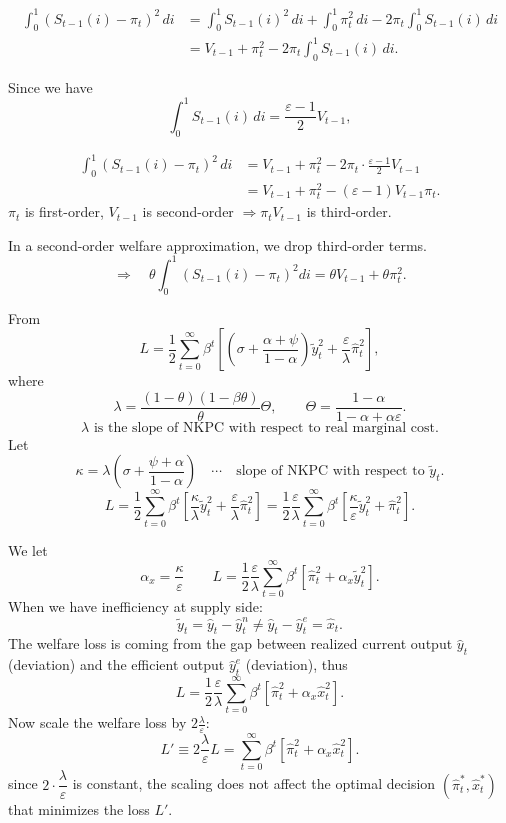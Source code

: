 \documentclass[11pt,fleqn]{article}
\newcommand{\purple}[1]{\textcolor{notePurple}{#1}}
\newcommand{\green}[1]{\textcolor{noteGreen}{#1}}
\newcommand{\purp}[1]{\purple{#1}}
\begin{document}
\begin{align*}
\int_0^1\left(S_{t-1}\left(i\right)-\pi_t\right)^2\,di
&=
\int_0^1 S_{t-1}\left(i\right)^2\,di
+\int_0^1 \pi_t^2\,di
-2\pi_t\int_0^1 S_{t-1}\left(i\right)\,di \\[2pt]
&=
V_{t-1}
+\pi_t^2
-2\pi_t\int_0^1 S_{t-1}\left(i\right)\,di .
\end{align*}

Since we have
\[
\int_0^1 S_{t-1}\left(i\right)\,di
=
\frac{\varepsilon-1}{2}V_{t-1},
\]

\begin{align*}
\int_0^1\left(S_{t-1}\left(i\right)-\pi_t\right)^2\,di
&=
V_{t-1}
+\pi_t^2
-2\pi_t\cdot
\frac{\varepsilon-1}{2}V_{t-1} \\[2pt]
&=
V_{t-1}
+\pi_t^2
-\left(\varepsilon-1\right)V_{t-1}\pi_t .
\end{align*}
\green{$\pi_t$ is first-order, $V_{t-1}$ is second-order $\Rightarrow \pi_tV_{t-1}$ is third-order.}

\green{In a second-order welfare approximation, we drop third-order terms.}
\[
\Rightarrow\quad
\theta\int_0^1\left(S_{t-1}\left(i\right)-\pi_t\right)^2di=\theta V_{t-1}+\theta\pi_t^2.
\]

From
\[
L=\frac12\sum_{t=0}^{\infty}\beta^t
\left[\left(\sigma+\frac{\alpha+\psi}{1-\alpha}\right)\tilde y_t^2
+\frac{\varepsilon}{\lambda}\hat\pi_t^2\right],
\]
where
\[
\lambda=\frac{\left(1-\theta\right)\left(1-\beta\theta\right)}{\theta}\Theta ,
\qquad
\Theta=\frac{1-\alpha}{1-\alpha+\alpha\varepsilon}.
\]
\[
\lambda\text{ is the slope of NKPC with respect to real marginal cost.}
\]
Let
\[
\kappa=\lambda\left(\sigma+\frac{\psi+\alpha}{1-\alpha}\right)
\quad\cdots\quad
\text{slope of NKPC with respect to }\tilde y_t.
\]
\[
L
=
\frac12\sum_{t=0}^{\infty}\beta^t
\left[
\frac{\kappa}{\lambda}\tilde y_t^2
+
\frac{\varepsilon}{\lambda}\hat\pi_t^2
\right]
=
\frac12\frac{\varepsilon}{\lambda}
\sum_{t=0}^{\infty}\beta^t
\left[
\frac{\kappa}{\varepsilon}\tilde y_t^2
+
\hat\pi_t^2
\right].
\]

\par\vspace{0.6em}
We let
\[
\alpha_x=\frac{\kappa}{\varepsilon}\qquad
L=\frac12\frac{\varepsilon}{\lambda}\sum_{t=0}^{\infty}\beta^t
\left[\hat\pi_t^2+\alpha_x\tilde y_t^2\right].
\]
When we have inefficiency at supply side:
\[
\tilde{y}_t
=
\hat{y}_t-\hat{y}_t^n
\neq
\hat{y}_t-\hat{y}_t^e
=
\hat{x}_t .
\]
The welfare loss is coming from the gap between realized current output $\hat y_t$ \purp{(deviation)} and the efficient output $\hat y_t^e$ \purp{(deviation)}, thus
\[
L=\frac12\frac{\varepsilon}{\lambda}\sum_{t=0}^{\infty}\beta^t
\left[\hat\pi_t^2+\alpha_x\hat x_t^2\right].
\]
Now scale the welfare loss by $2\frac{\lambda}{\varepsilon}$:
\[
L'\equiv2\frac{\lambda}{\varepsilon}L
=\sum_{t=0}^{\infty}\beta^t
\left[\hat\pi_t^2+\alpha_x\hat x_t^2\right].
\]
since $2\cdot\dfrac{\lambda}{\varepsilon}$ is constant, the scaling does not affect the optimal decision $\left(\hat\pi_t^*,\hat x_t^*\right)$ that minimizes the loss $L'$.
\end{document}

